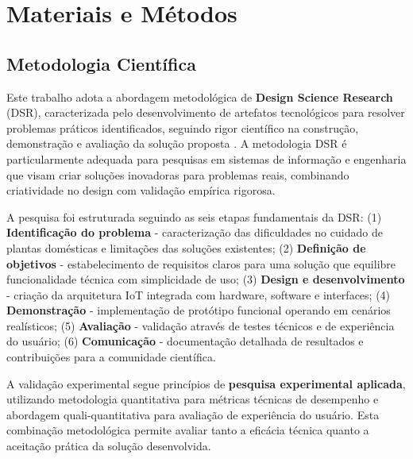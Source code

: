 
\chapter{Materiais e Métodos}

\section{Metodologia Científica}

Este trabalho adota a abordagem metodológica de \textbf{Design Science Research} (DSR), caracterizada pelo desenvolvimento de artefatos tecnológicos para resolver problemas práticos identificados, seguindo rigor científico na construção, demonstração e avaliação da solução proposta \cite{hevner2004}. A metodologia DSR é particularmente adequada para pesquisas em sistemas de informação e engenharia que visam criar soluções inovadoras para problemas reais, combinando criatividade no design com validação empírica rigorosa.

A pesquisa foi estruturada seguindo as seis etapas fundamentais da DSR: (1) \textbf{Identificação do problema} - caracterização das dificuldades no cuidado de plantas domésticas e limitações das soluções existentes; (2) \textbf{Definição de objetivos} - estabelecimento de requisitos claros para uma solução que equilibre funcionalidade técnica com simplicidade de uso; (3) \textbf{Design e desenvolvimento} - criação da arquitetura IoT integrada com hardware, software e interfaces; (4) \textbf{Demonstração} - implementação de protótipo funcional operando em cenários realísticos; (5) \textbf{Avaliação} - validação através de testes técnicos e de experiência do usuário; (6) \textbf{Comunicação} - documentação detalhada de resultados e contribuições para a comunidade científica.

A validação experimental segue princípios de \textbf{pesquisa experimental aplicada}, utilizando metodologia quantitativa para métricas técnicas de desempenho e abordagem quali-quantitativa para avaliação de experiência do usuário. Esta combinação metodológica permite avaliar tanto a eficácia técnica quanto a aceitação prática da solução desenvolvida.

